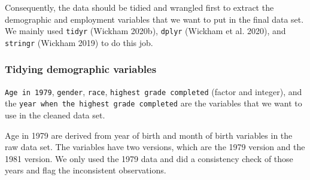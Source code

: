 \documentclass{article}
\begin{document}
Consequently, the data should be tidied and wrangled first to extract the demographic and employment variables that we want to put in the final data set. We mainly used \texttt{tidyr} (Wickham 2020b), \texttt{dplyr} (Wickham et al. 2020), and \texttt{stringr} (Wickham 2019) to do this job.

\hypertarget{tidying-demographic-variables}{%
\subsubsection{Tidying demographic variables}\label{tidying-demographic-variables}}

\texttt{Age\ in\ 1979}, \texttt{gender}, \texttt{race}, \texttt{highest\ grade\ completed} (factor and integer), and the \texttt{year\ when\ the\ highest\ grade\ completed} are the variables that we want to use in the cleaned data set.

Age in 1979 are derived from year of birth and month of birth variables in the raw data set. The variables have two versions, which are the 1979 version and the 1981 version. We only used the 1979 data and did a consistency check of those years and flag the inconsistent observations.
\end{document}

